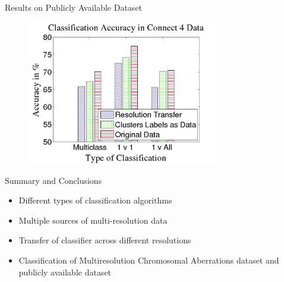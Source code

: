 \documentclass[utf8, a4paper]{beamer}
\begin{document}


\begin{frame}
  {Results on Publicly Available Dataset}
  \vspace{-1cm}
\begin{figure}
\centering
  \includegraphics[trim={0cm 0cm 0cm 0cm},clip, width=0.75\textwidth]{images/public}
\end{figure}  
\end{frame}



\begin{frame}
  {Summary and Conclusions}
 \begin{itemize}
    \itemsep 1.5em 
    \item Different types of classification algorithms  
    \item Multiple sources of multi-resolution data
    \item Transfer of classifier across different resolutions
    \item Classification of Multiresolution Chromosomal Aberrations dataset and publicly available dataset
    \end{itemize}

\end{frame}
\end{document}
